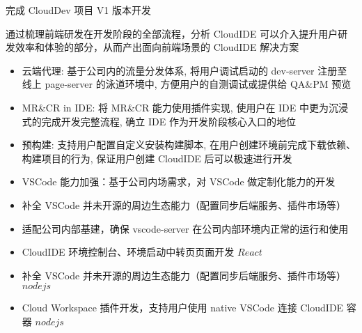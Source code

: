 \documentclass{resume}
\begin{document}
\begin{onehalfspacing}
完成 CloudDev 项目 V1 版本开发
\end{onehalfspacing}

\begin{onehalfspacing}
通过梳理前端研发在开发阶段的全部流程，分析 CloudIDE 可以介入提升用户研发效率和体验的部分，从而产出面向前端场景的 CloudIDE 解决方案
\begin{itemize}
  \item 云端代理: 基于公司内的流量分发体系, 将用户调试启动的 dev-server 注册至线上 page-server 的泳道环境中, 方便用户的自测调试或提供给 QA\&PM 预览
  \item MR\&CR in IDE: 将 MR\&CR 能力使用插件实现, 使用户在 IDE 中更为沉浸式的完成开发完整流程, 确立 IDE 作为开发阶段核心入口的地位
  \item 预构建: 支持用户配置自定义安装构建脚本, 在用户创建环境前完成下载依赖、构建项目的行为, 保证用户创建 CloudIDE 后可以极速进行开发
\end{itemize}
\end{onehalfspacing}

\begin{onehalfspacing}
\begin{itemize}
  \item VSCode 能力加强：基于公司内场需求，对 VSCode 做定制化能力的开发
  \item 补全 VSCode 并未开源的周边生态能力（配置同步后端服务、插件市场等）
  \item 适配公司内部基建，确保 vscode-server 在公司内部环境内正常的运行和使用
\end{itemize}
\end{onehalfspacing}

\begin{onehalfspacing}
\begin{itemize}
  \item CloudIDE 环境控制台、环境启动中转页页面开发 \(React\)
  \item 补全 VSCode 并未开源的周边生态能力（配置同步后端服务、插件市场等）\(nodejs\)
  \item Cloud Workspace 插件开发，支持用户使用 native VSCode 连接 CloudIDE 容器 \(nodejs\)
\end{itemize}
\end{onehalfspacing}
\end{document}
